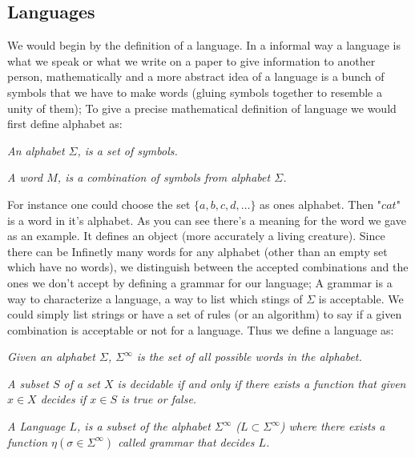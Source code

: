 \documentclass[9pt,a4paper,twocolumn]{article}
\begin{document}
                \subsection{Languages}
                    We would begin by the definition of a language. In a informal way a language is what we speak or what we write on a paper to give information to another person, mathematically and a more abstract idea of a language is a bunch of symbols that we have to make words (gluing symbols together to resemble a unity of them); To give a precise mathematical definition of language we would first define alphabet as:
                    \begin{define}
                        \textit{An alphabet $\Sigma$, is a set of symbols.}
                    \end{define}
                    \begin{define}
                        \textit{A word $M$, is a combination of symbols from alphabet $\Sigma$.}
                    \end{define}
                    For instance one could choose the set $\{a,b,c,d,\dots\}$ as ones alphabet. Then "$cat$" is a word in it's alphabet. As you can see there's a meaning for the word we gave as an example. It defines an object (more accurately a living creature). Since there can be Infinetly many words for any alphabet (other than an empty set which have no words), we distinguish between the accepted combinations and the ones we don't accept by defining a grammar for our language;  A grammar is a way to characterize a language, a way to list which stings of $\Sigma$ is acceptable. We could simply list strings or have a set of rules (or an algorithm) to say if a given combination is acceptable or not for a language. Thus we define a language as:
                    \begin{define}
                        \textit{Given an alphabet $\Sigma$, $\Sigma^\infty$ is the set of all possible words in the alphabet.}
                    \end{define}
                    \begin{define}
                        \textit{A subset $S$ of a set $X$ is decidable if and only if there exists a function that given $x\in X$ decides if $x\in S$ is true or false.}
                    \end{define}
                    \begin{define}
                        \textit{A Language $L$, is a subset of the alphabet $\Sigma^\infty$ ($L\subset \Sigma^\infty$) where there exists a function $\eta(\sigma\in\Sigma^\infty)$ called grammar that decides $L$.}
                    \end{define}
\end{document}
